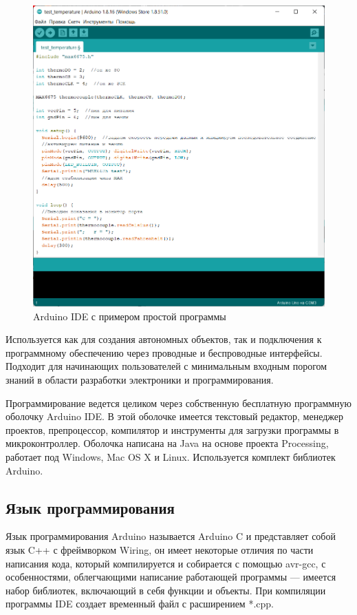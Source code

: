 \documentclass[12pt, oneside]{altsu-report}
\begin{document}
\begin{figure}[H]
    \centering
    \includegraphics[scale=0.6]{Arduino_IDE.png}
    \caption{Arduino IDE с примером простой программы}
    \label{fig:ide}
\end{figure}

Используется как для создания автономных объектов, так и подключения к программному обеспечению через проводные и беспроводные интерфейсы. Подходит для начинающих пользователей с минимальным входным порогом знаний в области разработки электроники и программирования.

Программирование ведется целиком через собственную бесплатную программную оболочку Arduino IDE. В этой оболочке имеется текстовый редактор, менеджер проектов, препроцессор, компилятор и инструменты для загрузки программы в микроконтроллер. Оболочка написана на Java на основе проекта Processing, работает под Windows, Mac OS X и Linux. Используется комплект библиотек Arduino.

\subsection{Язык программирования}

Язык программирования Arduino называется Arduino C и представляет собой язык C++ с фреймворком Wiring, он имеет некоторые отличия по части написания кода, который компилируется и собирается с помощью avr-gcc, с особенностями, облегчающими написание работающей программы — имеется набор библиотек, включающий в себя функции и объекты. При компиляции программы IDE создает временный файл с расширением *.cpp.
\end{document}
